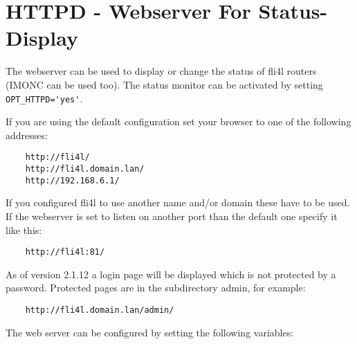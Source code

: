 \section{HTTPD - Webserver For Status-Display}


  The webserver can be used to display or change the status of fli4l 
  routers (IMONC can be used too). The status monitor can be activated by 
  setting \verb*?OPT_HTTPD='yes'?.

  If you are using the default configuration set your browser to one 
  of the following addresses:

\begin{example}
\begin{verbatim}
    http://fli4l/
    http://fli4l.domain.lan/ 
    http://192.168.6.1/
\end{verbatim}
\end{example}

  If you configured fli4l to use another name and/or domain these have 
  to be used. If the webserver is set to listen on another port than the 
  default one specify it like this:

\begin{example}
\begin{verbatim}
    http://fli4l:81/
\end{verbatim}
\end{example}

  As of version 2.1.12  a login page will be displayed which is not 
  protected by a password. Protected pages are in the subdirectory 
  admin, for example:
\begin{example}
\begin{verbatim}
    http://fli4l.domain.lan/admin/
\end{verbatim}
\end{example}

   The web server can be configured by setting the following variables:

